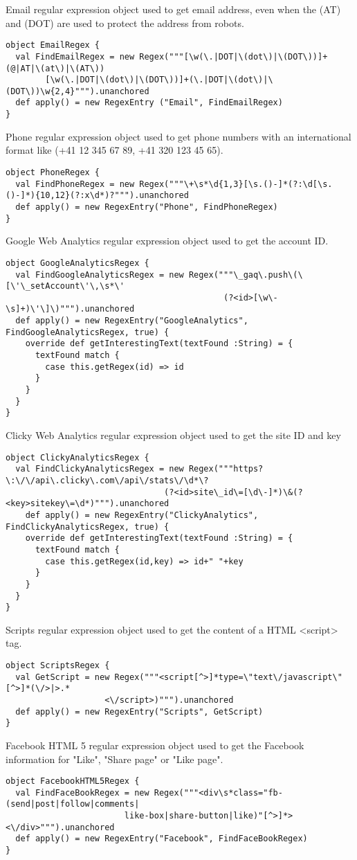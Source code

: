 \documentclass[
	a4paper,					10pt,							twoside,					openright,				notitlepage,			parskip=half,			]{scrreprt}
\begin{document}
Email regular expression object used to get email address, even when the (AT) and (DOT) are used to protect the address from robots.
\begin{lstlisting}
object EmailRegex {
  val FindEmailRegex = new Regex("""[\w(\.|DOT|\(dot\)|\(DOT\))]+(@|AT|\(at\)|\(AT\))
  		[\w(\.|DOT|\(dot\)|\(DOT\))]+(\.|DOT|\(dot\)|\(DOT\))\w{2,4}""").unanchored
  def apply() = new RegexEntry ("Email", FindEmailRegex) 
}
\end{lstlisting}
Phone regular expression object used to get phone numbers with an international format like (+41 12 345 67 89, +41 320 123 45 65).
\begin{lstlisting}
object PhoneRegex {
  val FindPhoneRegex = new Regex("""\+\s*\d{1,3}[\s.()-]*(?:\d[\s.()-]*){10,12}(?:x\d*)?""").unanchored
  def apply() = new RegexEntry("Phone", FindPhoneRegex)
}
\end{lstlisting}
Google Web Analytics regular expression object used to get the account ID.
\begin{lstlisting}
object GoogleAnalyticsRegex {
  val FindGoogleAnalyticsRegex = new Regex("""\_gaq\.push\(\[\'\_setAccount\'\,\s*\'
  											(?<id>[\w\-\s]+)\'\]\)""").unanchored
  def apply() = new RegexEntry("GoogleAnalytics", FindGoogleAnalyticsRegex, true) {
    override def getInterestingText(textFound :String) = {
      textFound match {
      	case this.getRegex(id) => id
      }
    }
  }
}
\end{lstlisting}
Clicky Web Analytics regular expression object used to get the site ID and key
\begin{lstlisting}
object ClickyAnalyticsRegex {
  val FindClickyAnalyticsRegex = new Regex("""https?\:\/\/api\.clicky\.com\/api\/stats\/\d*\?
  								(?<id>site\_id\=[\d\-]*)\&(?<key>sitekey\=\d*)""").unanchored
    def apply() = new RegexEntry("ClickyAnalytics", FindClickyAnalyticsRegex, true) {
    override def getInterestingText(textFound :String) = {
      textFound match {
      	case this.getRegex(id,key) => id+" "+key
      }
    }
  }
}
\end{lstlisting}
Scripts regular expression object used to get the content of a \gls{HTML} <script> tag.
\begin{lstlisting}
object ScriptsRegex {
  val GetScript = new Regex("""<script[^>]*type=\"text\/javascript\"[^>]*(\/>|>.*
  					<\/script>)""").unanchored
  def apply() = new RegexEntry("Scripts", GetScript)
}
\end{lstlisting}
Facebook HTML 5 regular expression object used to get the Facebook information for
"Like", "Share page" or "Like page".
\begin{lstlisting}
object FacebookHTML5Regex {
  val FindFaceBookRegex = new Regex("""<div\s*class="fb-(send|post|follow|comments|
  						like-box|share-button|like)"[^>]*><\/div>""").unanchored
  def apply() = new RegexEntry("Facebook", FindFaceBookRegex)
}
\end{lstlisting}
\end{document}
